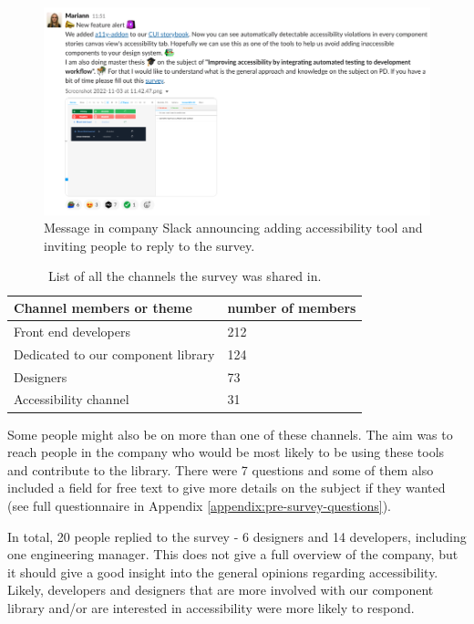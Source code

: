 \documentclass{master_thesis}
\begin{document}
\begin{figure}[H]
	\centering
	\includegraphics[width=\textwidth]{img/survey.png}
	\caption{Message in company Slack announcing adding accessibility tool and inviting people to reply to the survey.}
	\label{fig:slack-message}
\end{figure}

\begin{table}[H]
	\centering
	\caption{List of all the channels the survey was shared in.}

	\begin{tabular}{|l|l|}
		\hline
		\textbf{Channel members or theme} & \textbf{number of members}  \\
		\hline
		Front end developers  & 212  \\
		\hline
		Dedicated to our component library  & 124  \\
		\hline
		Designers  & 73  \\
		\hline
		Accessibility channel  & 31  \\
		\hline
	\end{tabular}
	\label{table:survey-shared}
\end{table}

Some people might also be on more than one of these channels. The aim was to reach people in the company who would be most likely to be using these tools and contribute to the library. There were 7 questions and some of them also included a field for free text to give more details on the subject if they wanted (see full questionnaire in Appendix \ref{appendix:pre-survey-questions}).

In total, 20 people replied to the survey - 6 designers and 14 developers, including one engineering manager. This does not give a full overview of the company, but it should give a good insight into the general opinions regarding accessibility. Likely, developers and designers that are more involved with our component library and/or are interested in accessibility were more likely to respond.
\end{document}
